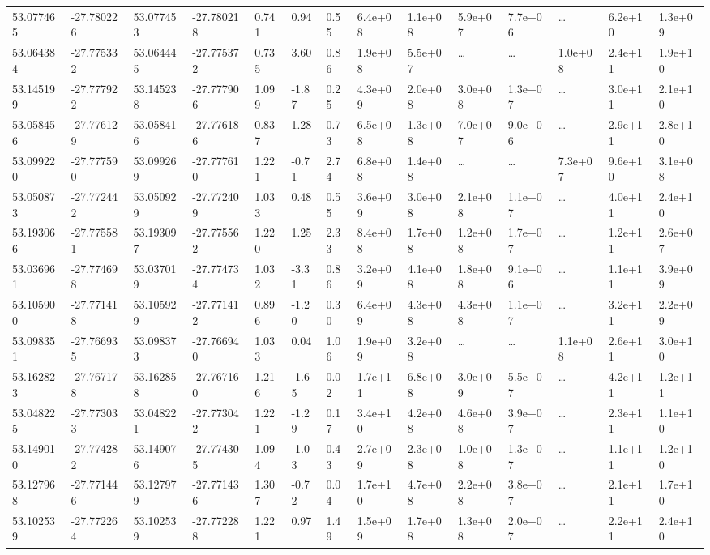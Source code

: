 \documentclass[referee]{aa}
\begin{document}
{\begin{landscape}
\begin{longtable}{llllllllllllll}
53.077465 & -27.780226 & 53.077453 & -27.780218 & 0.741 & 0.94 & 0.55 & 6.4e+08 & 1.1e+08 & 5.9e+07 & 7.7e+06 & \ldots & 6.2e+10 & 1.3e+09  \\
53.064384 & -27.775332 & 53.064445 & -27.775372 & 0.735 & 3.60 & 0.86 & 1.9e+08 & 5.5e+07 & \ldots & \ldots & 1.0e+08 & 2.4e+11 & 1.9e+10  \\
53.145199 & -27.777922 & 53.145238 & -27.777906 & 1.099 & -1.87 & 0.25 & 4.3e+09 & 2.0e+08 & 3.0e+08 & 1.3e+07 & \ldots & 3.0e+11 & 2.1e+10  \\
53.058456 & -27.776129 & 53.058416 & -27.776186 & 0.837 & 1.28 & 0.73 & 6.5e+08 & 1.3e+08 & 7.0e+07 & 9.0e+06 & \ldots & 2.9e+11 & 2.8e+10  \\
53.099220 & -27.777590 & 53.099269 & -27.777610 & 1.221 & -0.71 & 2.74 & 6.8e+08 & 1.4e+08 & \ldots & \ldots & 7.3e+07 & 9.6e+10 & 3.1e+08  \\
53.050873 & -27.772442 & 53.050929 & -27.772409 & 1.033 & 0.48 & 0.55 & 3.6e+09 & 3.0e+08 & 2.1e+08 & 1.1e+07 & \ldots & 4.0e+11 & 2.4e+10  \\
53.193066 & -27.775581 & 53.193097 & -27.775562 & 1.220 & 1.25 & 2.33 & 8.4e+08 & 1.7e+08 & 1.2e+08 & 1.7e+07 & \ldots & 1.2e+11 & 2.6e+07  \\
53.036961 & -27.774698 & 53.037019 & -27.774734 & 1.032 & -3.31 & 0.86 & 3.2e+09 & 4.1e+08 & 1.8e+08 & 9.1e+06 & \ldots & 1.1e+11 & 3.9e+09  \\
53.105900 & -27.771418 & 53.105929 & -27.771412 & 0.896 & -1.20 & 0.30 & 6.4e+09 & 4.3e+08 & 4.3e+08 & 1.1e+07 & \ldots & 3.2e+11 & 2.2e+09  \\
53.098351 & -27.766935 & 53.098373 & -27.766940 & 1.033 & 0.04 & 1.06 & 1.9e+09 & 3.2e+08 & \ldots & \ldots & 1.1e+08 & 2.6e+11 & 3.0e+10  \\
53.162823 & -27.767178 & 53.162858 & -27.767160 & 1.216 & -1.65 & 0.02 & 1.7e+11 & 6.8e+08 & 3.0e+09 & 5.5e+07 & \ldots & 4.2e+11 & 1.2e+11  \\
53.048225 & -27.773033 & 53.048221 & -27.773042 & 1.221 & -1.29 & 0.17 & 3.4e+10 & 4.2e+08 & 4.6e+08 & 3.9e+07 & \ldots & 2.3e+11 & 1.1e+10  \\
53.149010 & -27.774282 & 53.149076 & -27.774305 & 1.094 & -1.03 & 0.43 & 2.7e+09 & 2.3e+08 & 1.0e+08 & 1.3e+07 & \ldots & 1.1e+11 & 1.2e+10  \\
53.127968 & -27.771446 & 53.127979 & -27.771436 & 1.307 & -0.72 & 0.04 & 1.7e+10 & 4.7e+08 & 2.2e+08 & 3.8e+07 & \ldots & 2.1e+11 & 1.7e+10  \\
53.102539 & -27.772264 & 53.102539 & -27.772288 & 1.221 & 0.97 & 1.49 & 1.5e+09 & 1.7e+08 & 1.3e+08 & 2.0e+07 & \ldots & 2.2e+11 & 2.4e+10  \\

\end{longtable}
\end{landscape}}
\end{document}
